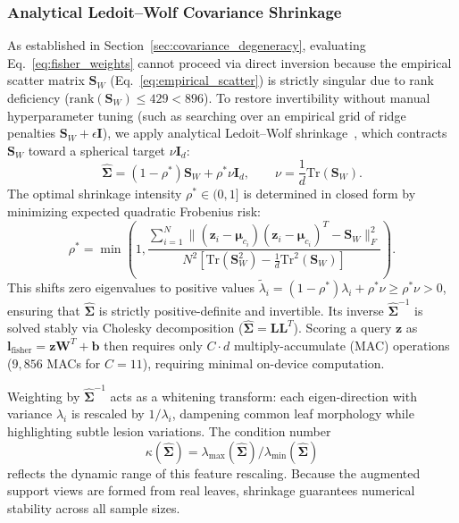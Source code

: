 \documentclass[preprint,12pt]{elsarticle}
\begin{document}
\subsubsection{Analytical Ledoit--Wolf Covariance Shrinkage}
\label{sec:shrinkage}
As established in Section~\ref{sec:covariance_degeneracy}, evaluating Eq.~\eqref{eq:fisher_weights} cannot proceed via direct inversion because the empirical scatter matrix $\mathbf{S}_W$ (Eq.~\eqref{eq:empirical_scatter}) is strictly singular due to rank deficiency ($\text{rank}(\mathbf{S}_W) \le 429 < 896$). To restore invertibility without manual hyperparameter tuning (such as searching over an empirical grid of ridge penalties $\mathbf{S}_W + \epsilon \mathbf{I}$), we apply analytical Ledoit--Wolf shrinkage~\cite{ledoit2004well}, which contracts $\mathbf{S}_W$ toward a spherical target $\nu \mathbf{I}_d$:
\begin{equation}
    \hat{\mathbf{\Sigma}} = (1 - \rho^*)\mathbf{S}_W + \rho^* \nu \mathbf{I}_d, \qquad \nu = \frac{1}{d}\text{Tr}(\mathbf{S}_W).
    \label{eq:lw_target}
\end{equation}
The optimal shrinkage intensity $\rho^* \in (0, 1]$ is determined in closed form by minimizing expected quadratic Frobenius risk:
\begin{equation}
    \rho^* = \min\left(1, \frac{\sum_{i=1}^N \|(\mathbf{z}_i - \boldsymbol{\mu}_{c_i})(\mathbf{z}_i - \boldsymbol{\mu}_{c_i})^T - \mathbf{S}_W\|_F^2}{N^2 \left[\text{Tr}(\mathbf{S}_W^2) - \frac{1}{d}\text{Tr}^2(\mathbf{S}_W)\right]}\right).
    \label{eq:lw_shrinkage}
\end{equation}
This shifts zero eigenvalues to positive values $\tilde{\lambda}_i = (1 - \rho^*)\lambda_i + \rho^* \nu \ge \rho^* \nu > 0$, ensuring that $\hat{\mathbf{\Sigma}}$ is strictly positive-definite and invertible. Its inverse $\hat{\mathbf{\Sigma}}^{-1}$ is solved stably via Cholesky decomposition ($\hat{\mathbf{\Sigma}} = \mathbf{L}\mathbf{L}^T$). Scoring a query $\mathbf{z}$ as $\mathbf{l}_{\text{fisher}} = \mathbf{z}\mathbf{W}^T + \mathbf{b}$ then requires only $C \cdot d$ multiply-accumulate (MAC) operations ($9{,}856$ MACs for $C=11$), requiring minimal on-device computation.

Weighting by $\hat{\mathbf{\Sigma}}^{-1}$ acts as a whitening transform: each eigen-direction with variance $\lambda_i$ is rescaled by $1/\lambda_i$, dampening common leaf morphology while highlighting subtle lesion variations. The condition number
\begin{equation}
    \kappa(\hat{\mathbf{\Sigma}}) = \lambda_{\max}(\hat{\mathbf{\Sigma}}) / \lambda_{\min}(\hat{\mathbf{\Sigma}})
    \label{eq:whitening_spread}
\end{equation}
reflects the dynamic range of this feature rescaling. Because the augmented support views are formed from real leaves, shrinkage guarantees numerical stability across all sample sizes.
\end{document}
